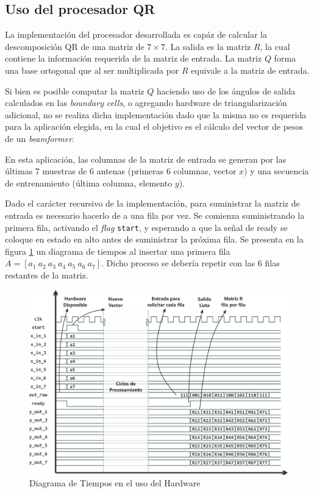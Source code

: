 \subsection{Uso del procesador QR}

La implementación del procesador desarrollada es capáz de calcular la descomposición QR de una matriz de $7 \times 7$. La salida es la matriz $R$, la cual contiene la información requerida de la matriz de entrada. La matriz $Q$ forma una base ortogonal que al ser multiplicada por $R$ equivale a la matriz de entrada. 

Si bien es posible computar la matriz $Q$ haciendo uso de los ángulos de salida calculados en las \textit{boundary cells}, o agregando hardware de triangularización adicional, no se realiza dicha implementación dado que la misma no es requerida para la aplicación elegida, en la cual el objetivo es el cálculo del vector de pesos de un \textit{beamformer}.

En esta aplicación, las columnas de la matriz de entrada se generan por las últimas $7$ muestras de $6$ antenas (primeras $6$ columnas, vector $x$) y una secuencia de entrenamiento (última columna, elemento $y$).

Dado el carácter recursivo de la implementación, para suministrar la matriz de entrada es necesario hacerlo de a una fila por vez. Se comienza suministrando la primera fila, activando el \textit{flag} \verb;start;, y esperando a que la señal de ready se coloque en estado en alto antes de suministrar la próxima fila. Se presenta en la figura \ref{fig:hardware_use} un diagrama de tiempos al insertar una primera fila $A = [a_1\ a_2\ a_3\ a_4\ a_5\ a_6\ a_7]$. Dicho proceso se debería repetir con las 6 filas restantes de la matriz.

\begin{figure}[!h]
 	\begin{center}
 		\includegraphics[width=11 cm]{./figures/C04-hardware_use}
 		\caption{Diagrama de Tiempos en el uso del Hardware}
		\label{fig:hardware_use}
 	\end{center}
\end{figure}

